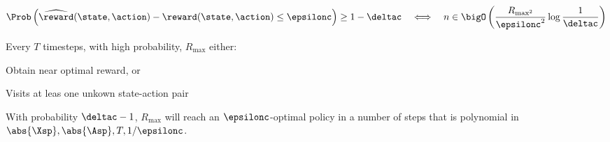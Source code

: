 \begin{propositionbox}\nospacing
  \begin{proposition}\label{proposition:number_of_samples_to_bound_reward}
   \begin{alignat}{4}
     \Prob\left(\widehat{\reward}(\state,\action)-\reward(\state,\action)\leq\epsilonc\right)\geq1-\deltac&&\iff&&
      n\in\bigO \left(\frac{R_{\max^{2}}}{\epsilonc^{2}}\log\frac{1}{\deltac}\right)
   \end{alignat}
  \end{proposition}
\end{propositionbox}
\begin{theorembox}\nospacing
  \begin{theorem}\label{theorem:rmax_exploration_vs_explotation}
    Every $T$ timesteps, with high probability, $R_{\max}$ either:
    \begin{itemizenosep}
      \item Obtain near optimal reward, or
      \item Visits at leas one unkown state-action pair
    \end{itemizenosep}
  \end{theorem}
\end{theorembox}
\begin{theorembox}\nospacing
  \begin{theorem}\label{theorem:performance_of_r-max}
    With probability $\deltac-1$, $R_{\max}$ will reach an $\epsilonc$-optimal policy in a number of steps that
    is polynomial in $\abs{\Xsp},\abs{\Asp},T,1/\epsilonc$.
  \end{theorem}
\end{theorembox}
